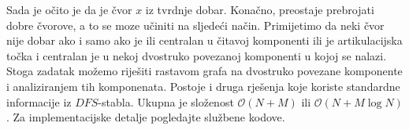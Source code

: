 Sada je očito je da je čvor $x$ iz tvrdnje dobar. Konačno, preostaje prebrojati dobre čvorove, a to se moze učiniti na sljedeći način. \iffalse Promotrimo tzv. \textit{block-cut tree} $T$ neke komponente (koja bez smanjenja općenitosti nije izolirani čvor), odnosno stablo čiji vrhovi odgovaraju artikulacijskim točkama i dvostruko povezanim komponentama, pri čemu je neka artikulacijska točka povezana s nekom dvostruko povezanom komponentom ako se nalazi u njoj. \fi Primijetimo da neki čvor nije dobar ako i samo ako je ili centralan u čitavoj komponenti ili je artikulacijska točka i centralan je u nekoj dvostruko povezanoj komponenti u kojoj se nalazi. Stoga zadatak možemo riješiti rastavom grafa na dvostruko povezane komponente i analiziranjem tih komponenata. Postoje i druga rješenja koje koriste standardne informacije iz $DFS$-stabla. Ukupna je složenost $\mathcal{O}(N + M)$ ili $\mathcal{O}(N + M\log N)$. Za implementacijske detalje pogledajte službene kodove.
